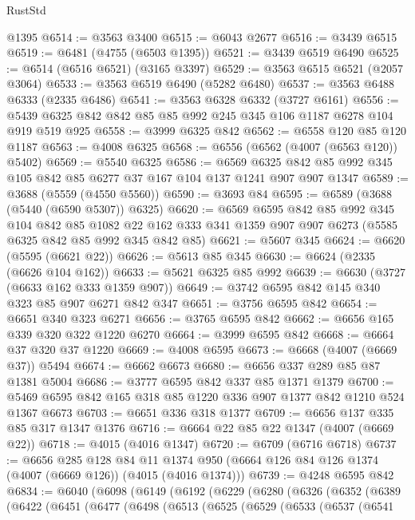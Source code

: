 \begin{lexlean}{RustStd}
\begin{coremodule}
    @1395
@6514 := @3563 @3400
@6515 := @6043 @2677
@6516 := @3439 @6515
@6519 := @6481 (@4755 (@6503 @1395))
@6521 := @3439 @6519 @6490
@6525 := @6514 (@6516 @6521) (@3165 @3397)
@6529 := @3563 @6515 @6521 (@2057 @3064)
@6533 := @3563 @6519 @6490 (@5282 @6480)
@6537 := @3563 @6488 @6333 (@2335 @6486)
@6541 := @3563 @6328 @6332 (@3727 @6161)
@6556 := @5439 @6325 @842 @842 @85 @85 @992 @245 @345 @106 @1187 @6278 @104 @919 @519 @925
@6558 := @3999 @6325 @842
@6562 := @6558 @120 @85 @120 @1187
@6563 := @4008 @6325
@6568 := @6556 (@6562 (@4007 (@6563 @120)) @5402)
@6569 := @5540 @6325
@6586 := @6569 @6325 @842 @85 @992 @345 @105 @842 @85 @6277 @37 @167 @104 @137 @1241 @907 @907 @1347
@6589 := @3688 (@5559 (@4550 @5560))
@6590 := @3693 @84
@6595 := @6589 (@3688 (@5440 (@6590 @5307)) @6325)
@6620 := @6569
    @6595
    @842
    @85
    @992
    @345
    @104
    @842
    @85
    @1082
    @22
    @162
    @333
    @341
    @1359
    @907
    @907
    @6273
    (@5585 @6325 @842 @85 @992 @345 @842 @85)
@6621 := @5607 @345
@6624 := @6620 (@5595 (@6621 @22))
@6626 := @5613 @85 @345
@6630 := @6624 (@2335 (@6626 @104 @162))
@6633 := @5621 @6325 @85 @992
@6639 := @6630 (@3727 (@6633 @162 @333 @1359 @907))
@6649 := @3742 @6595 @842 @145 @340 @323 @85 @907 @6271 @842 @347
@6651 := @3756 @6595 @842
@6654 := @6651 @340 @323 @6271
@6656 := @3765 @6595 @842
@6662 := @6656 @165 @339 @320 @322 @1220 @6270
@6664 := @3999 @6595 @842
@6668 := @6664 @37 @320 @37 @1220
@6669 := @4008 @6595
@6673 := @6668 (@4007 (@6669 @37)) @5494
@6674 := @6662 @6673
@6680 := @6656 @337 @289 @85 @87 @1381 @5004
@6686 := @3777 @6595 @842 @337 @85 @1371 @1379
@6700 := @5469 @6595 @842 @165 @318 @85 @1220 @336 @907 @1377 @842 @1210 @524 @1367 @6673
@6703 := @6651 @336 @318 @1377
@6709 := @6656 @137 @335 @85 @317 @1347 @1376
@6716 := @6664 @22 @85 @22 @1347 (@4007 (@6669 @22))
@6718 := @4015 (@4016 @1347)
@6720 := @6709 (@6716 @6718)
@6737 := @6656
    @285
    @128
    @84
    @11
    @1374
    @950
    (@6664 @126 @84 @126 @1374 (@4007 (@6669 @126)) (@4015 (@4016 @1374)))
@6739 := @4248 @6595 @842
@6834 := @6040
    (@6098
      (@6149
        (@6192
          (@6229
            (@6280
              (@6326
                (@6352
                  (@6389
                    (@6422
                      (@6451
                        (@6477
                          (@6498
                            (@6513
                              (@6525
                                (@6529
                                  (@6533
                                    (@6537
                                      (@6541

\end{coremodule}
\end{lexlean}
